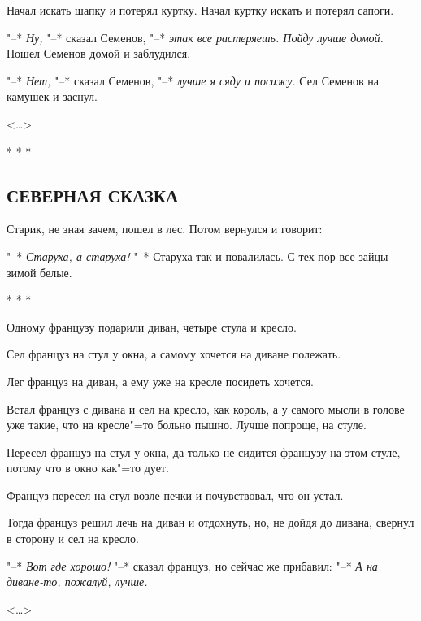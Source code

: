 \documentclass{article}
\begin{document}
Начал искать шапку и потерял куртку. Начал куртку искать и потерял сапоги.

"--* \textit{Ну,} "--* сказал Семенов, "--*  \textit{этак все растеряешь. Пойду лучше домой.} Пошел Семенов домой и заблудился.

"--* \textit{Нет,} "--* сказал Семенов, "--* \textit{лучше я сяду и посижу.} Сел Семенов на камушек и заснул.

\begin{flushright}<\dots>\end{flushright}

\begin{center}* * *\end{center}

\begin{center}\subsection*{\textbf{СЕВЕРНАЯ СКАЗКА}}\end{center}

Старик, не зная зачем, пошел в лес.  Потом вернулся и говорит: 

"--* \textit{Старуха, а старуха!} "--* Старуха так и повалилась. С тех пор все зайцы зимой белые.

\begin{center}* * *\end{center}

Одному  французу подарили диван, четыре стула и кресло.

Сел француз на стул у окна, а самому хочется на диване полежать.

Лег француз на диван, а ему уже на кресле посидеть хочется.

Встал француз с  дивана и сел на кресло, как король, а у самого  мысли  в голове  уже такие, что на кресле"=то больно пышно. Лучше попроще, на стуле.

Пересел француз на стул у окна, да только не сидится французу на этом стуле, потому что в окно как"=то дует.

Француз  пересел  на стул возле печки  и почувствовал, что он устал.

Тогда  француз решил лечь на диван и отдохнуть,  но, не дойдя до дивана, свернул в сторону и сел на кресло.

"--* \textit{Вот где хорошо!} "--* сказал француз, но сейчас же прибавил: "--* \textit{А на диване-то, пожалуй, лучше.}

\begin{flushright}<\dots>\end{flushright}
\end{document}
